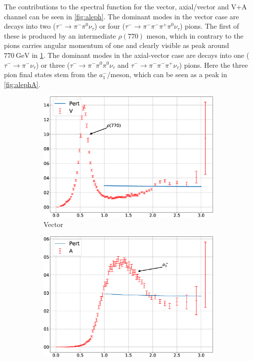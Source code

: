 \documentclass[../../index.tex]{subfiles}
\begin{document}
The contributions to the spectral function for the vector, axial\-/vector and
V+A channel can be seen in \cref{fig:aleph}. The dominant modes in the vector
case are \cite{Davier2006} decays into two (\(\tau^- \to \pi^-\pi^0 \nu_\tau\))
or four (\(\tau^- \to \pi^- \pi^- \pi^+ \pi^0 \nu_\tau\)) pions. The first of
these is produced by an intermediate \(\rho(770)\) meson, which in contrary to
the pions carries angular momentum of one and clearly visible as peak around
\(\SI{770}{\giga\eV}\) in \cref{fig:alephV}. The dominant modes in the
axial-vector case are decays into one (\(\tau^-\to \pi^-\nu_\tau\)) or three
(\(\tau^-\to \pi^- \pi^0 \pi^0 \nu_\tau\) and \(\tau^- \to \pi^- \pi^-
\pi^+\nu_\tau\)) pions. Here the three pion final states stem from the
\(a_1^-\)\-/meson, which can be seen as a peak in \cref{fig:alephA}.
\begin{figure}
  \centering
  \begin{subfigure}[b]{0.49\textwidth}
    \includegraphics[width=\textwidth]{./images/specFuncAleph_V.eps}
    \caption{Vector}
    \label{fig:alephV}
  \end{subfigure}
  \begin{subfigure}[b]{0.49\textwidth}
    \includegraphics[width=\textwidth]{./images/specFuncAleph_A.eps}

\end{subfigure}
\end{figure}
\end{document}
